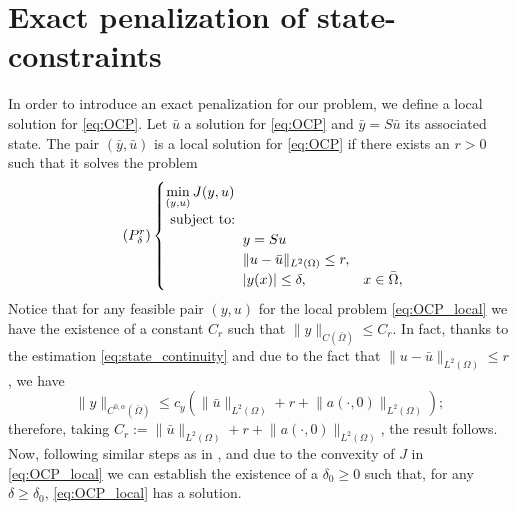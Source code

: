 \documentclass[11pt,a4paper]{amsart}
\renewcommand{\l}{\left}
\renewcommand{\r}{\right}
\newcommand{\om}{\Omega}
\newcommand{\norm}[1]{\lVert #1 \rVert}
\begin{document}
%


\section{Exact penalization of state-constraints }
In order to introduce an exact penalization for our problem, we define a local solution for \eqref{eq:OCP}. Let $\bar u$ a solution for \eqref{eq:OCP} and $\bar y=S\bar u$ its associated state. The pair $(\bar y, \bar u)$ is a local solution for \eqref{eq:OCP} if there exists an $r>0$ such that it solves the problem
\begin{equation}
		\tag{$P_{\delta}^r$} \label{eq:OCP_local}
		\begin{cases}
			\displaystyle\min_{(y,u)} J(y,u)\\
			\hbox{ subject to: }\\
			\hspace{40pt}\begin{array}{rll}
				&y=Su\\
                &\norm{u-\bar u}_{L^2(\om)}\le r,\\
				&|y(x)|\le \delta,&x\in \bar\om,
			\end{array}			
		\end{cases}
\end{equation}
Notice that for any feasible pair $(y,u)$ for the local problem \eqref{eq:OCP_local} we have the existence of a constant $C_r$ such that $\norm{y}_{C(\bar \om)}\le C_r$. In fact, thanks to the estimation \eqref{eq:state_continuity} and due to the fact that $\norm{u-\bar u}_{L^2(\om)}\le r$, we have
\[
\norm{y}_{C^{0,\alpha}(\bar\om)}\le c_y\l(\norm{\bar u}_{L^2(\om)}+r+\norm{a(\cdot,0)}_{L^2(\om)}\r);
\]
therefore, taking $C_r:=\norm{\bar u}_{L^2(\om)}+r+\norm{a(\cdot,0)}_{L^2(\om)}$, the result follows. Now, following similar steps as in \cite{casas2009}, and due to the convexity of $J$ in \eqref{eq:OCP_local} we can establish the existence of a $\delta_0\ge 0$ such that, for any $\delta \ge \delta_0$, \eqref{eq:OCP_local} has a solution. 
\end{document}
